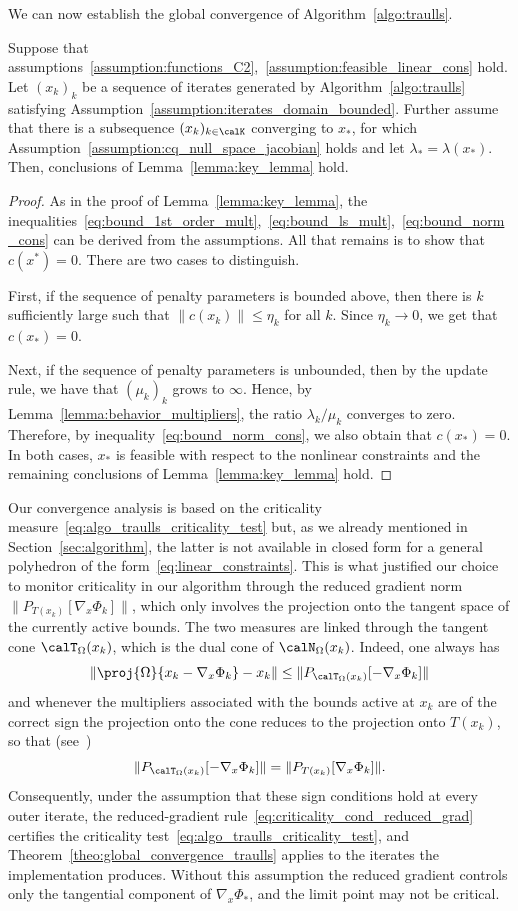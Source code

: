 We can now establish the global convergence of Algorithm~\ref{algo:traulls}.
\begin{theorem}\label{theo:global_convergence_traulls}
	Suppose that assumptions~\ref{assumption:functions_C2},~\ref{assumption:feasible_linear_cons} hold. Let $\left(x_k\right)_{k}$ be a sequence of iterates generated by Algorithm~\ref{algo:traulls} satisfying Assumption~\ref{assumption:iterates_domain_bounded}. Further assume that there is a subsequence $(x_k)_{k \in \calK}$ converging to $x_*$, for which Assumption~\ref{assumption:cq_null_space_jacobian} holds and let $\lambda_* = \lambda(x_*)$.
	Then, conclusions of Lemma~\ref{lemma:key_lemma} hold.
\end{theorem}
\begin{proof}
	As in the proof of Lemma~\eqref{lemma:key_lemma}, the inequalities~\eqref{eq:bound_1st_order_mult},~\eqref{eq:bound_ls_mult},~\eqref{eq:bound_norm_cons} can be derived from the assumptions. All that remains is to show that $c(x^*) = 0$. There are two cases to distinguish. 
	
	First, if the sequence of penalty parameters is bounded above, then there is $k$ sufficiently large such that $\|c(x_k)\| \le \eta_k$ for all $k$. Since $\eta_k \to 0$, we get that $c(x_*) = 0$.
	
	Next, if the sequence of penalty parameters is unbounded, then by the update rule, we have that $(\mu_k)_k$ grows to $\infty$. Hence, by Lemma~\ref{lemma:behavior_multipliers}, the ratio $\lambda_k /\mu_k$ converges to zero. Therefore, by inequality~\eqref{eq:bound_norm_cons}, we also obtain that $c(x_*) = 0$. 
	In both cases, $x_*$ is feasible with respect to the nonlinear constraints and the remaining conclusions of Lemma~\ref{lemma:key_lemma} hold.
\end{proof}
Our convergence analysis is based on the criticality measure~\eqref{eq:algo_traulls_criticality_test} but, as we already mentioned in Section~\ref{sec:algorithm}, the latter is not available in closed form for a general polyhedron of the form~\eqref{eq:linear_constraints}. This is what justified our choice to monitor criticality in our algorithm through the reduced gradient norm $\|P_{T(x_k)}[\nabla_x\Phi_k]\|$, which only involves the projection onto the tangent space of the currently active bounds. The two measures are linked through the tangent cone $\calT_\Omega(x_k)$, which is the dual cone of $\calN_\Omega(x_k)$. Indeed, one always has \[\|\proj{\Omega}{x_k-\nabla_x\Phi_k}-x_k\|\le\|P_{\calT_\Omega(x_k)}[-\nabla_x\Phi_k]\|\] 
and whenever the multipliers associated with the bounds active at $x_k$ are of the correct sign the projection onto the cone reduces to the projection onto $T(x_k)$, so that (see~\cite[Section 7.2]{conn-etal:1996b})
\[\|P_{\calT_\Omega(x_k)}[-\nabla_x\Phi_k]\|=\|P_{T(x_k)}[\nabla_x\Phi_k]\|.\] 
Consequently, under the assumption that these sign conditions hold at every outer iterate, the reduced-gradient rule~\eqref{eq:criticality_cond_reduced_grad} certifies the criticality test~\eqref{eq:algo_traulls_criticality_test}, and Theorem~\ref{theo:global_convergence_traulls} applies to the iterates the implementation produces. Without this assumption the reduced gradient controls only the tangential component of $\nabla_x\Phi_*$, and the limit point may not be critical.
